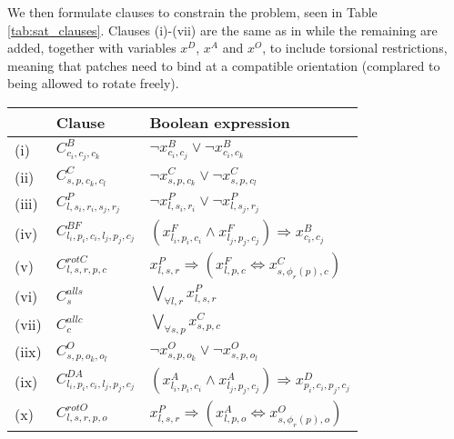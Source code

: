 We then formulate clauses to constrain the problem, seen in Table \ref{tab:sat_clauses}. Clauses (i)-(vii) are the same as in \cite{romano2020designing} while the remaining are added, together with variables \(x^D\), \(x^A\) and \(x^O\), to include torsional restrictions, meaning that patches need to bind at a compatible orientation (complared to being allowed to rotate freely).

\begin{table}[h!]
    \centering
    \begin{tabular}{|l|l|l|}
        \hline
        & Clause & Boolean expression \\ [0.5ex] 
        \hline
        \hline
        (i) & \(C^{B}_{c_i,c_j,c_k}\) & \(\neg x_{c_i,c_j}^{B} \lor \neg x_{c_i,c_k}^{B}\) \\ %
        (ii) &  \(C^{C}_{s,p,c_k,c_l}\) & \(\neg x_{s, p, c_k}^{C} \lor \neg x_{s, p, c_l}^{C}\) \\ %
        (iii) & \(C^{P}_{l, s_i, r_i, s_j, r_j}\)  & \(\neg x_{l,s_i,r_i}^{P} \lor \neg x_{l,s_j,r_j}^{P} \) \\ %
        (iv) & \(C^{BF}_{l_i,p_i,c_i,l_j,p_j,c_j}\) & \(\left(x_{l_i,p_i,c_i}^{F} \land x_{l_j,p_j,c_j}^{F} \right) \Rightarrow x_{c_i,c_j}^{B}\) \\ %
        (v) & \(C^{rotC}_{l,s,r,p,c}\) & \(x_{l,s,r}^{P} \Rightarrow \left(x_{l,p,c}^{F} \Leftrightarrow x_{s, \phi_r(p), c}^{C}\right)\) \\ %
        (vi) & \(C^{all s}_{s}\)  & \(\bigvee_{\forall l, r} x_{l,s,r}^{P}\) \\ %
        (vii) & \(C^{all c}_{c}\)  & \(\bigvee_{\forall s, p} x_{s,p,c}^{C}\) \\ %
        (iix) &  \(C^{O}_{s,p,o_k,o_l}\) & \(\neg x_{s, p, o_k}^{O} \lor \neg x_{s, p, o_l}^{O}\) \\ %
        (ix) & \(C^{DA}_{l_i,p_i,c_i,l_j,p_j,c_j}\) & \(\left(x_{l_i,p_i,c_i}^{A} \land x_{l_j,p_j,c_j}^{A} \right) \Rightarrow x_{p_i,c_i,p_j,c_j}^{D}\) \\ %
        (x) & \(C^{rotO}_{l,s,r,p,o}\) & \(x_{l,s,r}^{P} \Rightarrow \left(x_{l,p,o}^{A} \Leftrightarrow x_{s, \phi_r(p), o}^{O}\right)\) \\ %
        

\end{tabular}
\end{table}
